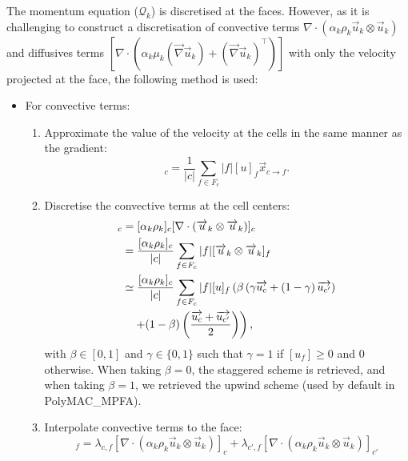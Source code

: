 The momentum equation ($\mathcal{Q}_k$) is discretised at the faces. However, as it is challenging to construct a discretisation of convective terms $\nabla \cdot (\alpha _k \rho _k \vec{u}_k \otimes \vec{u}_k)$ and diffusives terms $[\nabla \cdot (\alpha_k \mu _k (\vec{\nabla} \vec{u}_k) + (\vec{\nabla} \vec{u}_k)^\intercal) ]$ with only the velocity projected at the face, the following method is used:
\begin{itemize}
\item For convective terms:
  \begin{enumerate}
  \item Approximate the value of the velocity at the cells in the same manner as the gradient:
    \begin{equation}
      [\vec{u}]_c = \frac{1}{|c|} \sum _{f \in F_c} |f| [u]_f \vec{x}_{c \rightarrow f}.
    \end{equation}
  \item Discretise the convective terms at the cell centers:
    \begin{align}
      [\nabla \cdot ( \alpha _k \rho _k \vec{u}_k \otimes \vec{u}_k)]_c &= [\alpha _k \rho _k]_c [\nabla \cdot ( \vec{u}_k \otimes \vec{u}_k)]_c \\
                                                                        &= \frac{[\alpha _k \rho _k]_c}{|c|} \sum _{f \in F_c} |f| [\vec{u}_k \otimes \vec{u}_k]_f \\
                                                                        &\simeq \frac{[\alpha _k \rho _k]_c}{|c|} \sum _{f \in F_c} |f| [u]_f \left( \beta \left( \gamma \vec{u_c} + \left(1-\gamma \right) \vec{u_{c'}} \right) \right. \notag \\ & \quad \left. + (1-\beta) \left( \frac{\vec{u_c} +\vec{u_{c'}}}{2} \right) \right),
    \end{align}
    with $\beta \in [0,1]$ and $\gamma \in \{0,1\}$ such that $\gamma =1$ if $[u_f]\geq 0$ and $0$ otherwise. When taking $\beta =0$, the staggered scheme is retrieved, and when taking $\beta =1$, we retrieved the upwind scheme (used by default in PolyMAC\_MPFA).
  \item Interpolate convective terms to the face:
    \begin{equation}
      [\nabla \cdot (\alpha _k \rho _k \vec{u}_k \otimes \vec{u}_k)]_f = \lambda_{c,f} [\nabla \cdot (\alpha _k \rho _k \vec{u}_k \otimes \vec{u}_k)]_c + \lambda_{c',f} [\nabla \cdot (\alpha _k \rho _k \vec{u}_k \otimes \vec{u}_k)]_{c'}
    \end{equation}

\end{enumerate}
\end{itemize}
